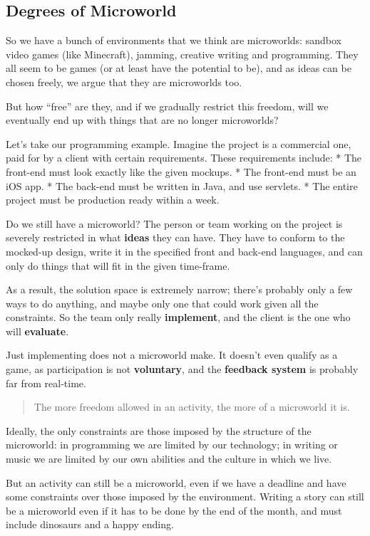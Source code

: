 \subsection{Degrees of Microworld}

So we have a bunch of environments that we think are microworlds:
sandbox video games (like Minecraft), jamming, creative writing and
programming. They all seem to be games (or at least have the potential
to be), and as ideas can be chosen freely, we argue that they are
microworlds too.

But how ``free'' are they, and if we gradually restrict this freedom,
will we eventually end up with things that are no longer microworlds?

Let's take our programming example. Imagine the project is a commercial
one, paid for by a client with certain requirements. These requirements
include: * The front-end must look exactly like the given mockups. * The
front-end must be an iOS app. * The back-end must be written in Java,
and use servlets. * The entire project must be production ready within a
week.

Do we still have a microworld? The person or team working on the project
is severely restricted in what \textbf{ideas} they can have. They have
to conform to the mocked-up design, write it in the specified front and
back-end languages, and can only do things that will fit in the given
time-frame.

As a result, the solution space is extremely narrow; there's probably
only a few ways to do anything, and maybe only one that could work given
all the constraints. So the team only really \textbf{implement}, and the
client is the one who will \textbf{evaluate}.

Just implementing does not a microworld make. It doesn't even qualify as
a game, as participation is not \textbf{voluntary}, and the
\textbf{feedback system} is probably far from real-time.

\begin{quote}
The more freedom allowed in an activity, the more of a microworld it is.
\end{quote}

Ideally, the only constraints are those imposed by the structure of the
microworld: in programming we are limited by our technology; in writing
or music we are limited by our own abilities and the culture in which we
live.

But an activity can still be a microworld, even if we have a deadline
and have some constraints over those imposed by the environment. Writing
a story can still be a microworld even if it has to be done by the end
of the month, and must include dinosaurs and a happy ending.

